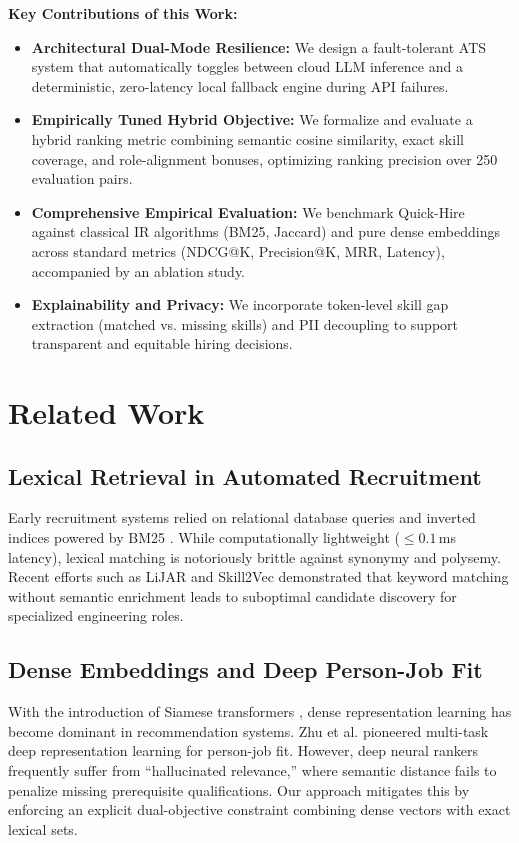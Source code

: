 \documentclass[conference]{IEEEtran}
\begin{document}
\textbf{Key Contributions of this Work:}
\begin{itemize}
    \item \textbf{Architectural Dual-Mode Resilience:} We design a fault-tolerant ATS system that automatically toggles between cloud LLM inference and a deterministic, zero-latency local fallback engine during API failures.
    \item \textbf{Empirically Tuned Hybrid Objective:} We formalize and evaluate a hybrid ranking metric combining semantic cosine similarity, exact skill coverage, and role-alignment bonuses, optimizing ranking precision over 250 evaluation pairs.
    \item \textbf{Comprehensive Empirical Evaluation:} We benchmark Quick-Hire against classical IR algorithms (BM25, Jaccard) and pure dense embeddings across standard metrics (NDCG@K, Precision@K, MRR, Latency), accompanied by an ablation study.
    \item \textbf{Explainability and Privacy:} We incorporate token-level skill gap extraction (matched vs. missing skills) and PII decoupling to support transparent and equitable hiring decisions.
\end{itemize}

\section{Related Work}

\subsection{Lexical Retrieval in Automated Recruitment}
Early recruitment systems relied on relational database queries and inverted indices powered by BM25 \cite{robertson2009probabilistic}. While computationally lightweight ($\le 0.1$\,ms latency), lexical matching is notoriously brittle against synonymy and polysemy. Recent efforts such as LiJAR \cite{borisyuk2016lijar} and Skill2Vec \cite{li2021skill2vec} demonstrated that keyword matching without semantic enrichment leads to suboptimal candidate discovery for specialized engineering roles.

\subsection{Dense Embeddings and Deep Person-Job Fit}
With the introduction of Siamese transformers \cite{reimers2019sentence, vaswani2017attention}, dense representation learning has become dominant in recommendation systems. Zhu et al. \cite{zhu2018person} pioneered multi-task deep representation learning for person-job fit. However, deep neural rankers frequently suffer from ``hallucinated relevance,'' where semantic distance fails to penalize missing prerequisite qualifications. Our approach mitigates this by enforcing an explicit dual-objective constraint combining dense vectors with exact lexical sets.
\end{document}
